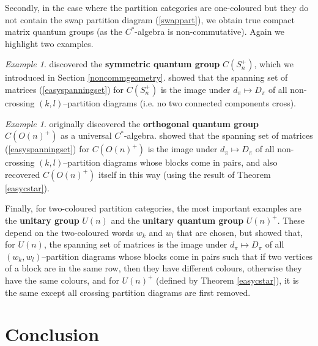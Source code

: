 \documentclass{article}
\theoremstyle{plain}
\theoremstyle{definition}
\theoremstyle{remark}
\newtheorem{example}[theorem]{Example}
\begin{document}
Secondly, in the case where the partition categories are one-coloured but
they do not contain the swap partition diagram (\ref{swappart}), we obtain true
compact matrix quantum groups 
(as the $C^*$-algebra is non-commutative). Again we highlight two examples.
\begin{example}
	\citet{wang1998} discovered the \textbf{symmetric quantum group} $C(S_n^+)$, which
	we introduced in Section \ref{noncommgeometry}.
	\citet{banica} showed that the spanning set of matrices (\ref{easyspanningset}) 
for $C(S_n^+)$ is the image under $d_\pi \mapsto D_\pi$ 
	of all non-crossing $(k,l)$--partition diagrams (i.e. no two connected components cross).
\end{example}
\begin{example}
	\cite{wang1995} originally discovered 
	the \textbf{orthogonal quantum group} $C(O(n)^+)$ as a universal $C^*$-algebra.
	\citet{banica} showed that the spanning set of matrices (\ref{easyspanningset}) 
for $C(O(n)^+)$ is the image under $d_\pi \mapsto D_\pi$ of 
	all non-crossing $(k,l)$--partition diagrams whose
	blocks come in pairs, and also recovered $C(O(n)^+)$ itself in this way (using the result of Theorem \ref{easycstar}).
\end{example}


Finally, for two-coloured partition categories, the most important examples are
the \textbf{unitary group} $U(n)$ and the \textbf{unitary quantum group} $U(n)^+$. 
These depend on the two-coloured words
$w_k$ and $w_l$ that are chosen, but \citet{tarrago2016, tarrago2018} showed that,
for $U(n)$, the spanning set of matrices is the image under $d_\pi \mapsto D_\pi$ 
of all $(w_k,w_l)$--partition diagrams whose blocks come in pairs 
such that if two vertices of a block are in the same row, 
then they have different colours, otherwise they have the same colours, and for
$U(n)^+$ (defined by Theorem \ref{easycstar}), it is the same except all crossing partition diagrams are first removed.





\section{Conclusion}
\end{document}
